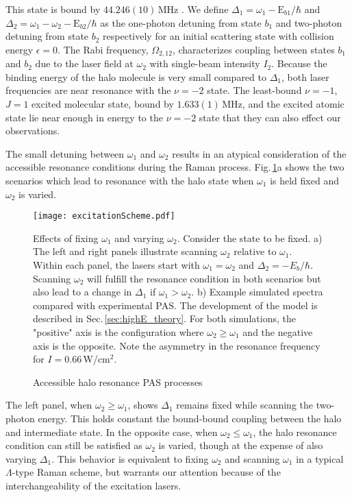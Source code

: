 This state is bound by $44.246(10)$\,MHz \cite{bmc14}.
We define $\Delta_1=\omega_1-\text{E}_{b1}/\hbar$ and $\Delta_2=\omega_1-\omega_2-\text{E}_{b2}/\hbar$ as the one-photon detuning from state $b_1$ and two-photon detuning from state $b_2$ respectively for an initial scattering state with collision energy $\epsilon=0$.
The Rabi frequency, $\Omega_{2,12}$, characterizes coupling between states $b_1$ and $b_2$ due to the laser field at $\omega_2$ with single-beam intensity $I_2$.
Because the binding energy of the halo molecule is very small compared to $\Delta_1$, both laser frequencies are near resonance with the $\nu=-2$ state. 
The least-bound $\nu=-1$, $J=1$ excited molecular state, bound by $1.633(1)$\,MHz, and the excited atomic state lie near enough in energy to the $\nu = -2$ state that they can also effect our observations.	

The small detuning between $\omega_1$ and $\omega_2$ results in an atypical consideration of the accessible resonance conditions during the Raman process.
Fig.\,\ref{fig:haloResProcess}a shows the two scenarios which lead to resonance with the halo state when $\omega_1$ is held fixed and $\omega_2$ is varied.
	\begin{figure} 
	\centerline{
	  \texttt{[image: excitationScheme.pdf]}}
	  \caption{Accessible halo resonance PAS processes}{Effects of fixing $\omega_1$ and varying $\omega_2$. Consider the state  to be fixed. a) The left and right panels illustrate scanning $\omega_2$ relative to $\omega_1$. Within each panel, the lasers start with $\omega_1 = \omega_2$ and $\Delta_2 = -E_b/\hbar$. Scanning $\omega_2$ will fulfill the resonance condition in both scenarios but also lead to a change in $\Delta_1$ if $\omega_1 > \omega_2$.  b) Example simulated spectra compared with experimental PAS. The development of the model is described in Sec.\,\ref{sec:highE_theory}. For both simulations, the "positive" axis is the configuration where $\omega_2 \geq \omega_1$ and the negative axis is the opposite. Note the asymmetry in the resonance frequency for $I=0.66$\,W/cm$^2$.}
	  \label{fig:haloResProcess}
	\end{figure}
The left panel, when $\omega_2 \geq \omega_1$, shows $\Delta_1$ remains fixed while scanning the two-photon energy.
This holds constant the bound-bound coupling between the halo and intermediate state.
In the opposite case, when $\omega_2 \leq \omega_1$, the halo resonance condition can still be satisfied as $\omega_2$ is varied, though at the expense of also varying $\Delta_1$.
This behavior is equivalent to fixing $\omega_2$ and scanning $\omega_1$ in a typical $\Lambda$-type Raman scheme, but warrants our attention because of the interchangeability of the excitation lasers.


